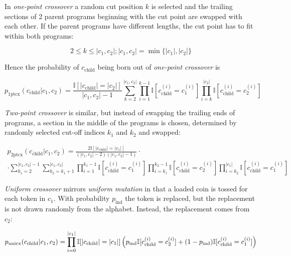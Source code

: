 In \emph{one-point crossover} a random cut position $k$ is selected and the trailing sections of 2 parent programs beginning with the cut point are swapped with each other. 
If the parent programs have different lengths, the cut point has to fit within both programs:

\begin{equation}
    2 \leq k \leq |c_1,c_2|; |c_1,c_2| = \min\{|c_1|, |c_2|\}
\end{equation}

Hence the probability of $c_\text{child}$ being born out of \emph{one-point crossover} is

\begin{equation}
    p_\text{1ptcx}(c_\text{child}|c_1,c_2) =
        \frac{\mathbb{I}[|c_\text{child}|=|c_2|]}{|c_1,c_2|-1}
        \sum\limits_{k=2}^{|c_1,c_2|} \prod\limits_{i=1}^{k-1} \mathbb{I}[c_\text{child}^{(i)} = c_1^{(i)}] \prod\limits_{i=k}^{|c_2|} \mathbb{I}[c_\text{child}^{(i)} = c_2^{(i)}]
\end{equation}

\emph{Two-point crossover} is similar, but instead of swapping the trailing ends of programs, a section in the middle of the programs is chosen, determined by randomly selected cut-off indices $k_1$ and $k_2$ and swapped:

\begin{multline}
    p_\text{2ptcx}(c_\text{child}|c_1,c_2) =
        \frac{2 \mathbb{I}[|c_\text{child}|=|c_1|]}{(|c_1,c_2|-2)(|c_1,c_2|-1)} 
        \cdot \\ \cdot
        \sum\limits_{k_1=2}^{|c_1,c_2|-1}
        \sum\limits_{k_2=k_1+1}^{|c_1,c_2|} 
        \prod\limits_{i=1}^{k_1-1} \mathbb{I}[c_\text{child}^{(i)} = c_1^{(i)}] \prod\limits_{i=k_1}^{k_2-1} \mathbb{I}[c_\text{child}^{(i)} = c_2^{(i)}]
        \prod\limits_{i=k_2}^{|c_1|} \mathbb{I}[c_\text{child}^{(i)} = c_1^{(i)}]
\end{multline}

\emph{Uniform crossover} mirrors \emph{uniform mutation} in that a loaded coin is tossed for each token in $c_1$. With probability $p_\text{ind}$ the token is replaced, but the replacement is not drawn randomly from the alphabet. Instead, the replacement comes from $c_2$:

\begin{equation}
    p_\text{unicx}(c_\text{child}|c_1,c_2) = \prod\limits_{i=0}^{|c_1|} \mathbb{I}[|c_\text{child}|=|c_1|] \\ \left(p_\text{ind} \mathbb{I}[c_\text{child}^{(i)} = c_2^{(i)}] + (1 - p_\text{ind}) \mathbb{I}[c_\text{child}^{(i)} = c_1^{(i)}] \right)
\end{equation}

